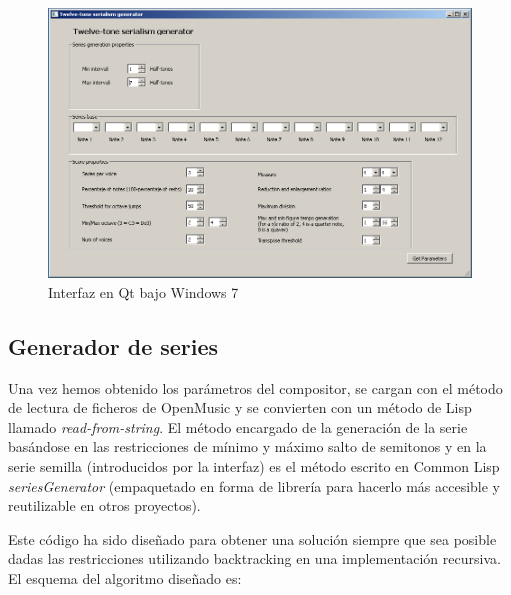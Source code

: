 \documentclass[a4paper,openany,12pt]{memoir}
\begin{document}
\begin{figure}
\centering
\includegraphics[width=\textwidth]{img/qtprogram.png}
\caption{Interfaz en Qt bajo Windows 7} \label{fig:qtinterface}
\end{figure}

\subsection{Generador de series}
Una vez hemos obtenido los parámetros del compositor, se cargan con el método de lectura de ficheros de OpenMusic y se convierten con un método de Lisp llamado \emph{read-from-string}. El método encargado de la generación de la serie basándose en las restricciones de mínimo y máximo salto de semitonos y en la serie semilla (introducidos por la interfaz) es el método escrito en Common Lisp \emph{seriesGenerator} (empaquetado en forma de librería para hacerlo más accesible y reutilizable en otros proyectos).

Este código ha sido diseñado para obtener una solución siempre que sea posible dadas las restricciones utilizando backtracking en una implementación recursiva. El esquema del algoritmo diseñado es:
\end{document}
